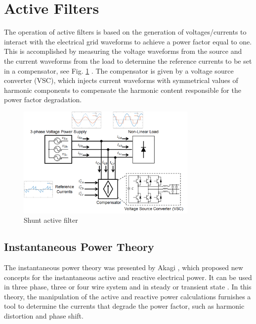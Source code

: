 \section{Active Filters}

The operation of active filters is based on the generation of voltages/currents to interact with the electrical grid waveforms to achieve a power factor equal to one. This is accomplished by measuring the voltage waveforms from the source and the current waveforms from the load to determine the reference currents to be set in a compensator, see Fig. \ref{fig:compensador.png} \citep{Akagi2006}. The compensator is given by a voltage source converter (VSC), which injects current waveforms with symmetrical values of harmonic components to compensate the harmonic content responsible for the power factor degradation.

\begin{figure}[!h]
	\centering
	\includegraphics[width=0.78\textwidth]{Figures/compensador.png}
	\caption{Shunt active filter}
	\label{fig:compensador.png}
\end{figure}



\subsection{Instantaneous Power Theory}

The instantaneous power theory was presented by Akagi \citep{Akagi1984}, which proposed new concepts for the instantaneous active and reactive electrical power. It can be used in three phase, three or four wire system and in steady or transient state \citep{Akagi2007}. In this theory, the manipulation of the active and reactive power calculations furnishes a tool to determine the currents that degrade the power factor, such as harmonic distortion and phase shift.

